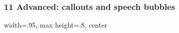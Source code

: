 
\begin{frame}
    \frametitle{11 Advanced: callouts and speech bubbles}

    \begin{adjustbox}{width=.95\linewidth, max height=.8\textheight, center}
        
    \end{adjustbox}
\end{frame}
